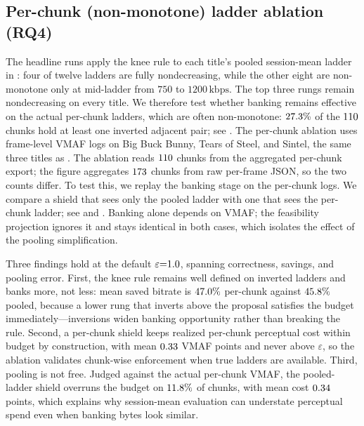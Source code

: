 \subsection{Per-chunk (non-monotone) ladder ablation (RQ4)}
\label{sec:eval:perchunk}

The headline runs apply the knee rule to each title's pooled session-mean ladder in : four of twelve ladders are fully nondecreasing, while the other eight are non-monotone only at mid-ladder from \(750\) to \(1200\,\mathrm{kbps}\). The top three rungs remain nondecreasing on every title. We therefore test whether banking remains effective on the actual per-chunk ladders, which are often non-monotone: \(27.3\%\) of the \(110\) chunks hold at least one inverted adjacent pair; see .
The per-chunk ablation uses frame-level VMAF logs on Big Buck Bunny, Tears of Steel, and Sintel, the same three titles as . The ablation reads \(110\) chunks from the aggregated per-chunk export; the figure aggregates \(173\) chunks from raw per-frame JSON, so the two counts differ.
To test this, we replay the banking stage on the per-chunk logs. We compare a shield that sees only the pooled ladder with one that sees the per-chunk ladder; see  and . Banking alone depends on VMAF; the feasibility projection ignores it and stays identical in both cases, which isolates the effect of the pooling simplification.

Three findings hold at the default \(\varepsilon{=}1.0\), spanning correctness, savings, and pooling error.
First, the knee rule remains well defined on inverted ladders and banks more, not less: mean saved bitrate is \(47.0\%\) per-chunk against \(45.8\%\) pooled, because a lower rung that inverts above the proposal satisfies the budget immediately---inversions widen banking opportunity rather than breaking the rule.
Second, a per-chunk shield keeps realized per-chunk perceptual cost within budget by construction, with mean \(0.33\) VMAF points and never above \(\varepsilon\), so the ablation validates chunk-wise enforcement when true ladders are available.
Third, pooling is not free. Judged against the actual per-chunk VMAF, the pooled-ladder shield overruns the budget on \(11.8\%\) of chunks, with mean cost \(0.34\) points, which explains why session-mean evaluation can understate perceptual spend even when banking bytes look similar.


